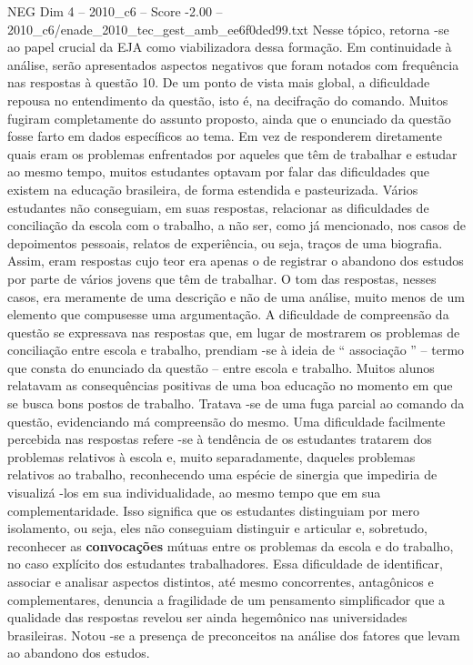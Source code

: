 \begin{textsample}{NEG Dim 4 – 2010\_c6 – Score -2.00 – 2010\_c6/enade\_2010\_tec\_gest\_amb\_ee6f0ded99.txt}
Nesse tópico, retorna -se ao papel crucial da EJA como viabilizadora dessa formação.
Em continuidade à análise, serão apresentados aspectos negativos que foram notados com frequência nas respostas à questão 10.
De um ponto de vista mais global, a dificuldade repousa no entendimento da questão, isto é, na decifração do comando.
Muitos fugiram completamente do assunto proposto, ainda que o enunciado da questão fosse farto em dados específicos ao tema.
Em vez de responderem diretamente quais eram os problemas enfrentados por aqueles que têm de trabalhar e estudar ao mesmo tempo, muitos estudantes optavam por falar das dificuldades que existem na educação brasileira, de forma estendida e pasteurizada.
Vários estudantes não conseguiam, em suas respostas, relacionar as dificuldades de conciliação da escola com o trabalho, a não ser, como já mencionado, nos casos de depoimentos pessoais, relatos de experiência, ou seja, traços de uma biografia.
Assim, eram respostas cujo teor era apenas o de registrar o abandono dos estudos por parte de vários jovens que têm de trabalhar.
O tom das respostas, nesses casos, era meramente de uma descrição e não de uma análise, muito menos de um elemento que compusesse uma argumentação.
A dificuldade de compreensão da questão se expressava nas respostas que, em lugar de mostrarem os problemas de conciliação entre escola e trabalho, prendiam -se à ideia de “ associação ” – termo que consta do enunciado da questão – entre escola e trabalho.
Muitos alunos relatavam as consequências positivas de uma boa educação no momento em que se busca bons postos de trabalho.
Tratava -se de uma fuga parcial ao comando da questão, evidenciando má compreensão do mesmo.
Uma dificuldade facilmente percebida nas respostas refere -se à tendência de os estudantes tratarem dos problemas relativos à escola e, muito separadamente, daqueles problemas relativos ao trabalho, reconhecendo uma espécie de sinergia que impediria de visualizá -los em sua individualidade, ao mesmo tempo que em sua complementaridade.
Isso significa que os estudantes distinguiam por mero isolamento, ou seja, eles não conseguiam distinguir e articular e, sobretudo, reconhecer as \textbf{convocações} mútuas entre os problemas da escola e do trabalho, no caso explícito dos estudantes trabalhadores.
Essa dificuldade de identificar, associar e analisar aspectos distintos, até mesmo concorrentes, antagônicos e complementares, denuncia a fragilidade de um pensamento simplificador que a qualidade das respostas revelou ser ainda hegemônico nas universidades brasileiras.
Notou -se a presença de preconceitos na análise dos fatores que levam ao abandono dos estudos.

\end{textsample}
